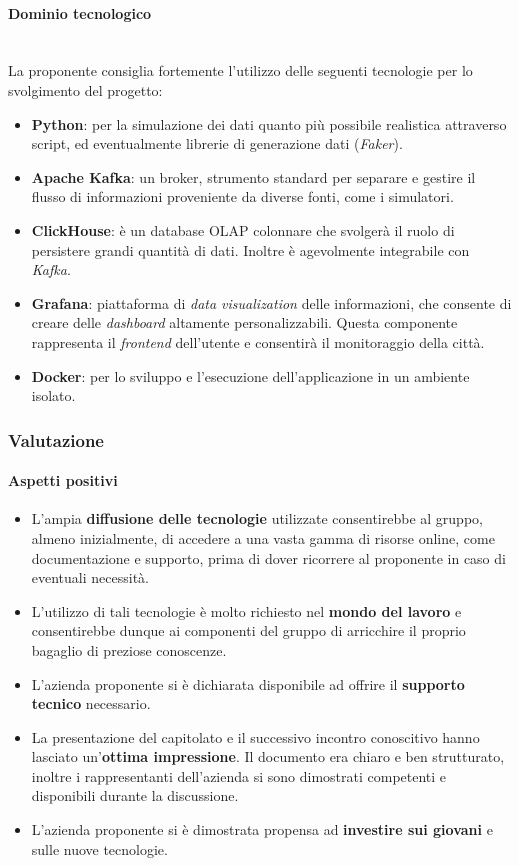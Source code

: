 \documentclass[italian,12pt]{article} %
\begin{document}
\paragraph{Dominio tecnologico}\mbox{}\\
La proponente consiglia fortemente l'utilizzo delle seguenti tecnologie per lo svolgimento del progetto:
\begin{itemize}
	\item\textbf{Python}: per la simulazione dei dati quanto più possibile realistica attraverso script, ed eventualmente librerie di generazione dati (\textit{Faker}).
	\item\textbf{Apache Kafka}: un broker, strumento standard per separare e gestire il flusso di informazioni proveniente da diverse fonti, come i simulatori.
	\item\textbf{ClickHouse}: è un database OLAP colonnare che svolgerà il ruolo di persistere grandi quantità di dati. Inoltre è agevolmente integrabile con \textit{Kafka}.
	\item\textbf{Grafana}: piattaforma di \textit{data visualization} delle informazioni, che consente di creare delle \textit{dashboard} altamente personalizzabili. Questa componente rappresenta il \textit{frontend} dell'utente e consentirà il monitoraggio della città.
	\item\textbf{Docker}: per lo sviluppo e l'esecuzione dell'applicazione in un ambiente isolato.
\end{itemize}

\subsubsection{Valutazione}
\paragraph{Aspetti positivi}
\begin{itemize}
	\item L'ampia \textbf{diffusione delle tecnologie} utilizzate consentirebbe al gruppo, almeno inizialmente, di accedere a una vasta gamma di risorse online, come documentazione e supporto, prima di dover ricorrere al proponente in caso di eventuali necessità.
	\item L'utilizzo di tali tecnologie è molto richiesto nel \textbf{mondo del lavoro} e consentirebbe dunque ai componenti del gruppo di arricchire il proprio bagaglio di preziose conoscenze.
	\item L'azienda proponente si è dichiarata disponibile ad offrire il \textbf{supporto tecnico} necessario.
	\item La presentazione del capitolato e il successivo incontro conoscitivo hanno lasciato un'\textbf{ottima impressione}. Il documento era chiaro e ben strutturato, inoltre i rappresentanti dell'azienda si sono dimostrati competenti e disponibili durante la discussione.
	\item L'azienda proponente si è dimostrata propensa ad \textbf{investire sui giovani} e sulle nuove tecnologie.
\end{itemize}
\end{document}
